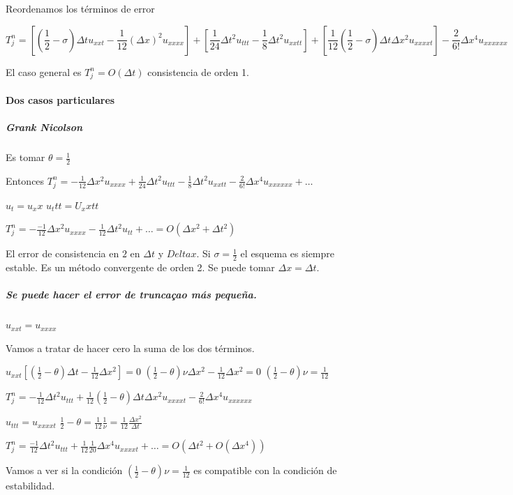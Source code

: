Reordenamos los términos de error

$$T_j^n = \left[(\frac{1}{2}-\sigma)\Delta t u_{xxt}- \frac{1}{12}(\Delta x)^2 u_{xxxx}\right]
+ \left[\frac{1}{24}\Delta t^2 u_{ttt}-\frac{1}{8}\Delta t ^2 u_{xxtt}\right]
+ \left[\frac{1}{12}(\frac{1}{2}-\sigma)\Delta t \Delta x^2 u_{xxxxt}\right]
- \frac{2}{6!}\Delta x ^4 u_{xxxxxx}$$

El caso general es $T_j^n = O(\Delta t)$ consistencia de orden 1.

\paragraph{Dos casos particulares}
\subparagraph{Grank Nicolson}
Es tomar $\theta = \frac{1}{2}$

Entonces
$T_j^n = -\frac{1}{12}\Delta x^2 u_{xxxx} + \frac{1}{24}\Delta t^2u_{ttt}-\frac{1}{8}\Delta t ^2u_{xxtt} - \frac{2}{6!}\Delta x ^4 u_{xxxxxx} + \hdots$

$u_t = u_xx$
$u_ttt = U_xxtt$

$T_j^n = -\frac{-1}{12}\Delta x^2 u_{xxxx} -\frac{1}{12}\Delta t^2 u_{tt} + \hdots = O(\Delta x^2 + \Delta t ^2)$

El error de consistencia en $2$ en $\Delta t$ y $Delta x$. Si $\sigma = \frac{1}{2}$ el esquema es siempre estable.
Es un método convergente de orden 2. Se puede tomar $\Delta x = \Delta t$.

\subparagraph{Se puede hacer el error de truncaçao más pequeña.}
$u_{xxt} = u_{xxxx}$

Vamos a tratar de hacer cero la suma de los dos términos.

$u_{xxt}\left[(\frac{1}{2}-\theta)\Delta t - \frac{1}{12}\Delta x^2\right] = 0$
$(\frac{1}{2}-\theta)\nu\Delta x^2 - \frac{1}{12}\Delta x^2 = 0$
$(\frac{1}{2}-\theta)\nu = \frac{1}{12}$

$T_j^n = -\frac{1}{12}\Delta t^2 u_{ttt} + \frac{1}{12}(\frac{1}{2}-\theta)\Delta t \Delta x^2u_{xxxxt}
-\frac{2}{6!}\Delta x^4 u_{xxxxxx}$

$u_{ttt} = u_{xxxxt}$
$\frac{1}{2}-\theta = \frac{1}{12}\frac{1}{\nu} = \frac{1}{12}\frac{\Delta x ^2}{\Delta t}$

$T_j^n = \frac{-1}{12}\Delta t^2  u_{ttt} +\frac{1}{12}\frac{1}{20}\Delta x^4u_{xxxxt} +\hdots
= O(\Delta t^2 + O(\Delta x ^4))$

Vamos a ver si la condición $(\frac{1}{2}-\theta)\nu = \frac{1}{12}$ es compatible con la condición de estabilidad.


